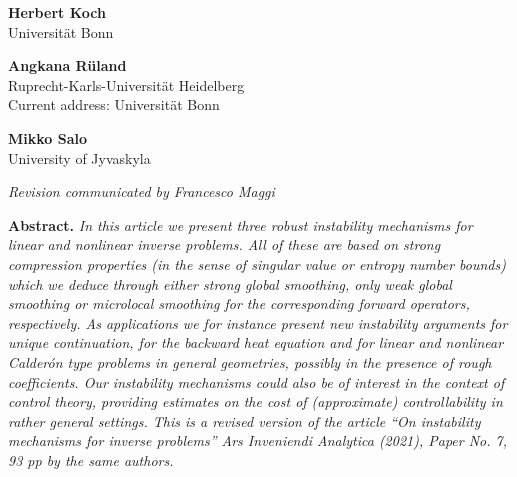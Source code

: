 \documentclass[12pt,twoside]{amsart}
\numberwithin{equation}{section}
\begin{document}
\begin{minipage}[t]{.28\textwidth}
\begin{center}
{\large{\bf{Herbert Koch}}} \\
\vskip0.15cm
\footnotesize{Universit\"at Bonn}
\end{center}
\end{minipage}
\hfill
\noindent
\begin{minipage}[t]{.28\textwidth}
\begin{center}
{\large{\bf{Angkana R\"uland}}} \\
\vskip0.15cm
\footnotesize{Ruprecht-Karls-Universit\"at Heidelberg}\\
\footnotesize{Current address: Universit\"at Bonn}
\end{center}
\end{minipage}
\hfill
\noindent
\begin{minipage}[t]{.28\textwidth}
\begin{center}
{\large{\bf{Mikko Salo}}} \\
\vskip0.15cm
\footnotesize{University of Jyvaskyla}
\end{center}
\end{minipage}

\vspace{1cm}


\begin{center}
\noindent \em{Revision communicated by Francesco Maggi}
\end{center}
\vspace{1cm}



\noindent \textbf{Abstract.} \textit{In this article we present three robust instability mechanisms for linear and nonlinear inverse problems. All of these are based on strong compression properties (in the sense of singular value or entropy number bounds) which we deduce through either strong global smoothing, only weak global smoothing or microlocal smoothing for the corresponding forward operators, respectively. As applications we for instance present new instability arguments for unique continuation, for the backward heat equation and for linear and nonlinear Calder\'on type problems in general geometries, possibly in the presence of rough coefficients. 
Our instability mechanisms could also be of interest in the context of control theory, providing estimates on the cost of (approximate) controllability in rather general settings. This is a revised version of the article ``On instability mechanisms for inverse problems'' Ars Inveniendi Analytica (2021), Paper No. 7, 93 pp by the same authors.}
\vskip0.3cm
\end{document}
